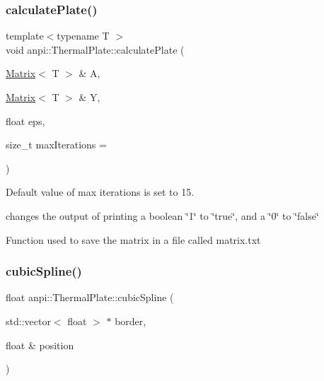 \mbox{\label{classanpi_1_1ThermalPlate_af439080df5deeae14923d780e7d7dd3d}} 
\subsubsection{\texorpdfstring{calculate\+Plate()}{calculatePlate()}}
{\footnotesize\ttfamily template$<$typename T $>$ \\
void anpi\+::\+Thermal\+Plate\+::calculate\+Plate (\begin{DoxyParamCaption}\item[{\hyperlink{classanpi_1_1Matrix}{Matrix}$<$ T $>$ \&}]{A,  }\item[{\hyperlink{classanpi_1_1Matrix}{Matrix}$<$ T $>$ \&}]{Y,  }\item[{float}]{eps,  }\item[{size\+\_\+t}]{max\+Iterations = {} }\end{DoxyParamCaption})\hspace{0.3cm}{\ttfamily [inline]}}



Default value of max iterations is set to 15. 

changes the output of printing a boolean \char`\"{}1\char`\"{} to \char`\"{}true\char`\"{}, and a \char`\"{}0\char`\"{} to \char`\"{}false\char`\"{}

Function used to save the matrix in a file called matrix.\+txt \mbox{\label{classanpi_1_1ThermalPlate_a06b979536f63310dc7c7dddd18eca8a5}} 
\subsubsection{\texorpdfstring{cubic\+Spline()}{cubicSpline()}}
{\footnotesize\ttfamily float anpi\+::\+Thermal\+Plate\+::cubic\+Spline (\begin{DoxyParamCaption}\item[{std\+::vector$<$ float $>$ $\ast$}]{border,  }\item[{float \&}]{position }\end{DoxyParamCaption})\hspace{0.3cm}{\ttfamily [inline]}}


